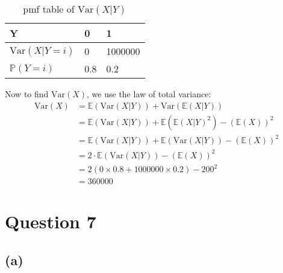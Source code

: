 \documentclass[12pt]{article}
\begin{document}
\begin{table}[H]
    \centering
    \begin{tabular}{l | l | l}
        \hline Y & 0 & 1 \\ \hline 
        $\text{Var}(X | Y = i)$ & 0 & 1000000 \\ \hline 
        $ \mathbb{P}(Y = i)$ & 0.8 & 0.2 \\ \hline 
    \end{tabular}
    \caption{pmf table of $\text{Var}(X | Y)$}
    \label{tab:6-pmfvar}
\end{table}

\noindent Now to find $\text{Var}(X)$, we use the law of total variance: \begin{align*}
    \text{Var}(X) &= \mathbb{E}(\text{Var}(X|Y)) + \text{Var}(\mathbb{E}(X | Y)) \\ 
    &= \mathbb{E}(\text{Var}(X|Y)) + \mathbb{E}(\mathbb{E}(X | Y)^{2}) - (\mathbb{E}(X))^{2} \\ 
    &= \mathbb{E}(\text{Var}(X|Y)) + \mathbb{E}(\text{Var}(X|Y)) - (\mathbb{E}(X))^{2} \\ 
    &= 2 \cdot \mathbb{E}(\text{Var}(X|Y)) - (\mathbb{E}(X))^{2} \\ 
    &= 2 \left( 0 \times 0.8 + 1000000 \times 0.2 \right) - 200^{2} \\ 
    &= \boxed{360000}
\end{align*}

\newpage

\section*{Question 7}

\subsection*{(a)}
\end{document}
